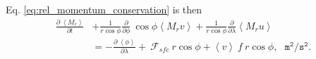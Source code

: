 \documentclass[11pt]{article}
\numberwithin{equation}{section}
\newcommand{\beq}{\begin{equation}}
\newcommand{\eeq}{\end{equation}}
\newcommand{\la}{\langle}
\newcommand{\ra}{\rangle}
\newcommand{\lara}[1]{\left\la{#1}\right\ra}
\newcommand{\cphi}{\cos \phi}
\begin{document}
Eq. \eqref{eq:rel_momentum_conservation} is then 
\begin{align} \label{eq:vert_int}
\frac{\partial ~\lara{M_r}}{\partial t}  &+ \frac{1}{r \cos{\phi}}  \frac{\partial}{\partial \phi}  ~\cos{\phi} \lara{ M_r v } + \frac{1}{r \cos{\phi}} \frac{\partial}{\partial \lambda} \lara{M_r u} \nonumber \\ 
&=   - \frac{\partial~\lara{\phi}}{\partial \lambda} + ~ \mathcal{F}_{sfc}~ r \cphi + \lara{v} ~ f ~r \cphi,    ~~~\mathtt{m^2 /s^2}.  
\end{align}

%
\end{document}
